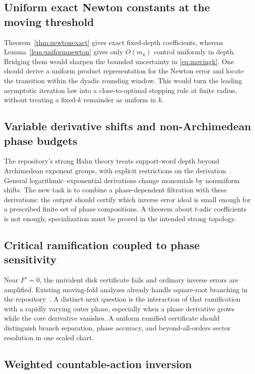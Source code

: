 \documentclass[11pt,a4paper]{article}
\theoremstyle{definition}
\theoremstyle{remark}
\numberwithin{equation}{section}
\begin{document}
\subsection{Uniform exact Newton constants at the moving threshold}

Theorem~\ref{thm:newtonexact} gives exact fixed-depth coefficients, whereas Lemma~\ref{lem:uniformnewton} gives only $O(m_k)$ control uniformly in depth. Bridging them would sharpen the bounded uncertainty in \eqref{eq:movingk}. One should derive a uniform product representation for the Newton error and locate the transition within the dyadic rounding window. This would turn the leading asymptotic iteration law into a close-to-optimal stopping rule at finite radius, without treating a fixed-$k$ remainder as uniform in $k$.

\subsection{Variable derivative shifts and non-Archimedean phase budgets}

The repository's strong Hahn theory treats support-word depth beyond Archimedean exponent groups, with explicit restrictions on the derivation~\cite{RepoNonArch}. General logarithmic--exponential derivations change monomials by nonuniform shifts. The new task is to combine a phase-dependent filtration with these derivations: the output should certify which inverse error ideal is small enough for a prescribed finite set of phase compositions. A theorem about $t$-adic coefficients is not enough; specialization must be proved in the intended strong topology.

\subsection{Critical ramification coupled to phase sensitivity}

Near $F'=0$, the univalent disk certificate fails and ordinary inverse errors are amplified. Existing moving-fold analyses already handle square-root branching in the repository~\cite{RepoIndex}. A distinct next question is the interaction of that ramification with a rapidly varying outer phase, especially when a phase derivative grows while the core derivative vanishes. A uniform ramified certificate should distinguish branch separation, phase accuracy, and beyond-all-orders sector resolution in one scaled chart.

\subsection{Weighted countable-action inversion}
\end{document}
